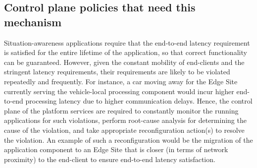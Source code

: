 \subsection{Control plane policies that need this mechanism}
Situation-awareness applications require that the end-to-end latency requirement is satisfied for the entire lifetime of the application, so that correct functionality can be guaranteed. However, given the constant mobility of end-clients and the stringent latency requirements, their requirements are likely to be violated repeatedly and frequently. For instance, a car moving away for the Edge Site currently serving the vehicle-local processing component would incur higher end-to-end processing latency due to higher communication delays. Hence, the control plane of the platform services are required to constantly monitor the running applications for such violations, perform root-cause analysis for determining the cause of the violation, and take appropriate reconfiguration action(s) to resolve the violation. An example of such a reconfiguration would be the migration of the application component to an Edge Site that is closer (in terms of network proximity) to the end-client to ensure end-to-end latency satisfaction.

